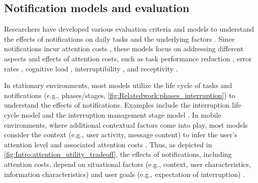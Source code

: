 \subsection{Notification models and evaluation}
\label{sec:Relatedwork:notification_evaluation}

Researchers have developed various evaluation criteria and models to understand the effects of notifications on daily tasks and the underlying factors \cite{anderson_survey_2018}. Since notifications incur attention costs \cite{mccrickard_attuning_2003}, these models focus on addressing different aspects and effects of attention costs, such as task performance reduction \cite{pejovic_investigating_2015, bailey_effects_2001, cutrell_notification_2001}, error rates \cite{adamczyk_if_2004}, cognitive load \cite{zuger_interruptibility_2015, okoshi_reducing_2015, iqbal_investigating_2005}, interruptibility \cite{pejovic_interruptme_2014}, and receptivity \cite{mehrotra_designing_2015, sarker_assessing_2014}.


In stationary environments, most models utilize the life cycle of tasks and notifications (e.g., phases/stages, \autoref{fig:Relatedwork:phases_interruption}) to understand the effects of notifications. Examples include the interruption life cycle model \cite{iqbal_disruption_2007} and the interruption management stage model \cite{latorella_effects_1998}. In mobile environments, where additional contextual factors come into play, most models consider the context (e.g., user activity, message content) to infer the user's attention level and associated attention costs \cite{anderson_survey_2018, mehrotra_intelligent_2018, pejovic_interruptme_2014, ho_using_2005}.
Thus, as depicted in \autoref{fig:Intro:attention_utility_tradeoff}, the effects of notifications, including attention costs, depend on situational factors (e.g., context, user characteristics, information characteristics) and user goals (e.g., expectation of interruption) \cite{mccrickard_attuning_2003, mccrickard_model_2003, gluck_matching_2007}.


